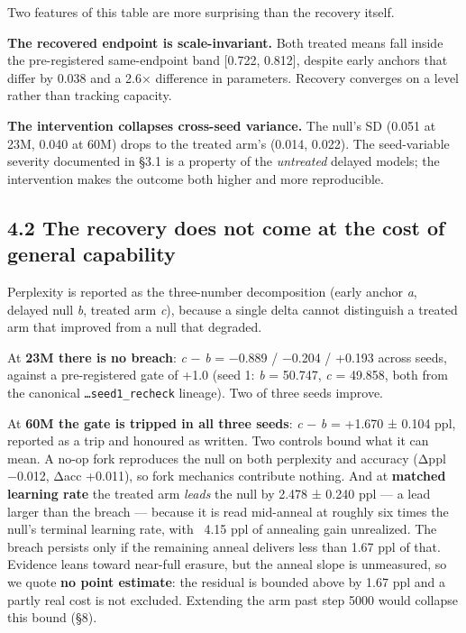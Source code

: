 \documentclass[11pt]{article}
\begin{document}
Two features of this table are more surprising than the recovery itself.

\textbf{The recovered endpoint is scale-invariant.} Both treated means fall inside the
pre-registered same-endpoint band {[}0.722, 0.812{]}, despite early anchors that differ by
0.038 and a 2.6× difference in parameters. Recovery converges on a level rather than
tracking capacity.

\textbf{The intervention collapses cross-seed variance.} The null's SD (0.051 at 23M, 0.040 at
60M) drops to the treated arm's (0.014, 0.022). The seed-variable severity documented in
§3.1 is a property of the \emph{untreated} delayed models; the intervention makes the outcome
both higher and more reproducible.

\subsection{4.2 The recovery does not come at the cost of general capability}\label{the-recovery-does-not-come-at-the-cost-of-general-capability}

Perplexity is reported as the three-number decomposition (early anchor \emph{a}, delayed null
\emph{b}, treated arm \emph{c}), because a single delta cannot distinguish a treated arm that
improved from a null that degraded.

At \textbf{23M there is no breach}: \emph{c} − \emph{b} = −0.889 / −0.204 / +0.193 across seeds, against a
pre-registered gate of +1.0 (seed 1: \emph{b} = 50.747, \emph{c} = 49.858, both from the canonical
\texttt{…seed1\_recheck} lineage). Two of three seeds improve.

At \textbf{60M the gate is tripped in all three seeds}: \emph{c} − \emph{b} = +1.670 ± 0.104 ppl, reported
as a trip and honoured as written. Two controls bound what it can mean. A no-op fork
reproduces the null on both perplexity and accuracy (Δppl −0.012, Δacc +0.011), so fork
mechanics contribute nothing. And at \textbf{matched learning rate} the treated arm \emph{leads} the
null by 2.478 ± 0.240 ppl — a lead larger than the breach — because it is read mid-anneal at
roughly six times the null's terminal learning rate, with ~4.15 ppl of annealing gain
unrealized. The breach persists only if the remaining anneal delivers less than 1.67 ppl of
that. Evidence leans toward near-full erasure, but the anneal slope is unmeasured, so we
quote \textbf{no point estimate}: the residual is bounded above by 1.67 ppl and a partly real cost
is not excluded. Extending the arm past step 5000 would collapse this bound (§8).
\end{document}
